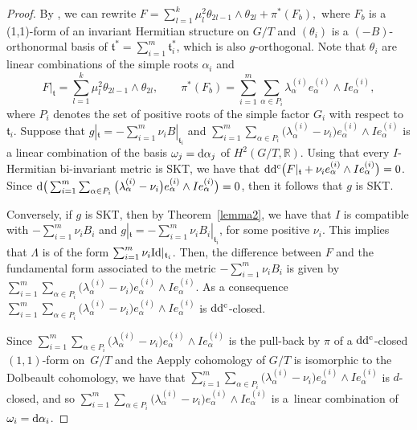\documentclass[10pt,a4paper]{amsart}
\numberwithin{equation}{section}
\begin{document}
\begin{proof} By \cite{GGP}, we can rewrite $F = \sum_{l = 1}^k \mu_l^2 \theta_{2l-1}\wedge\theta_{2l} + \pi^*(F_b),$
where $F_b$ is a (1,1)-form of an invariant Hermitian structure on $G/T$ and $(\theta_i)$ is a $(-B)$-orthonormal basis of $\mathfrak t^*= \sum_{i =1}^m \mathfrak t_i^*$, which is also $g$-orthogonal. Note that $\theta_i$ are linear combinations of the simple roots $\alpha_i$ and
\[
F |_{\mathfrak t} = \sum_{l = 1}^k \mu_l^2 \theta_{2l-1}\wedge\theta_{2l}, \qquad \pi^*(F_b) = \sum_{i =1}^m \sum_{\alpha \in P_i} \lambda_{\alpha}^{(i)} e_{\alpha}^{(i)} \wedge I e_{\alpha}^{(i)},
\]
where $P_i$ denotes the set of positive roots of the simple factor $G_i$ with respect to $\mathfrak t_i$.
Suppose that $g |_{\mathfrak t} = - \sum_{i=1}^m \nu_i B|_{\mathfrak t_i}$ and $ \sum_{i =1}^m \sum_{\alpha \in P_i} \big(\lambda_{\alpha}^{(i)} - \nu_i\big) e_{\alpha}^{(i)} \wedge I e_{\alpha}^{(i)}$ is a linear combination of the basis $\omega_j = {\rm d} \alpha_j$ of $H^2(G/T, \mathbb R)$. Using that every $I$-Hermitian bi-invariant metric is SKT, we have that ${\rm d}{\rm d}^{\rm c} \big(F |_{\mathfrak t} + \nu_i e_{\alpha}^{(i)} \wedge I e_{\alpha}^{(i)}\big) =0$.
Since ${\rm d}\big(\sum_{i =1}^m \sum_{\alpha \in P_i } \big(\lambda_{\alpha}^{(i)} - \nu_i\big) e_{\alpha}^{(i)} \wedge I e_{\alpha}^{(i)}\big)=0$, then it follows that $g$ is SKT.

Conversely, if $g$ is SKT, then by Theorem~\ref{lemma2}, we have that $I$ is compatible with $- \sum_{i =1}^m \nu_i B_i$ and $g |_{\mathfrak t} = - \sum_{i =1}^m \nu_i B_i |_{\mathfrak t_i}$, for some positive $\nu_i$. This implies that $\Lambda$ is of the form $ \sum_{i=1}^m \nu_i {\rm Id}|_{\mathfrak t_i}$. Then, the difference between $F$ and the fundamental form associated to the metric $- \sum_{i =1}^m \nu_i B_i$ is given by $ \sum_{i =1}^m \sum_{\alpha \in P_i } \big(\lambda_{\alpha}^{(i)} - \nu_i\big) e_{\alpha}^{(i)} \wedge I e_{\alpha}^{(i)}$.
As a consequence $ \sum_{i =1}^m \sum_{\alpha \in P_i} \big(\lambda_{\alpha}^{(i)} - \nu_i\big) e_{\alpha}^{(i)} \wedge I e_{\alpha}^{(i)}$ is ${\rm d} {\rm d}^{\rm c}$-closed.

Since $ \sum_{i =1}^m \sum_{\alpha \in P_i} \big(\lambda_{\alpha}^{(i)} - \nu_i\big) e_{\alpha}^{(i)} \wedge I e_{\alpha}^{(i)}$ is the pull-back by $\pi$ of a ${\rm d} {\rm d}^{\rm c}$-closed $(1,1)$-form on~$G/T$ and the Aepply cohomology of $G/T$ is isomorphic to the Dolbeault cohomology, we have that $ \sum_{i =1}^m \sum_{\alpha \in P_i} \big(\lambda_{\alpha}^{(i)} - \nu_i\big) e_{\alpha}^{(i)} \wedge I e_{\alpha}^{(i)}$ is $d$-closed, and so $ \sum_{i =1}^m \sum_{\alpha \in P_i} \big(\lambda_{\alpha}^{(i)} - \nu_i\big) e_{\alpha}^{(i)} \wedge I e_{\alpha}^{(i)}$ is a~linear combination of $ \omega_i = {\rm d} \alpha_i$.
\end{proof}
\end{document}
